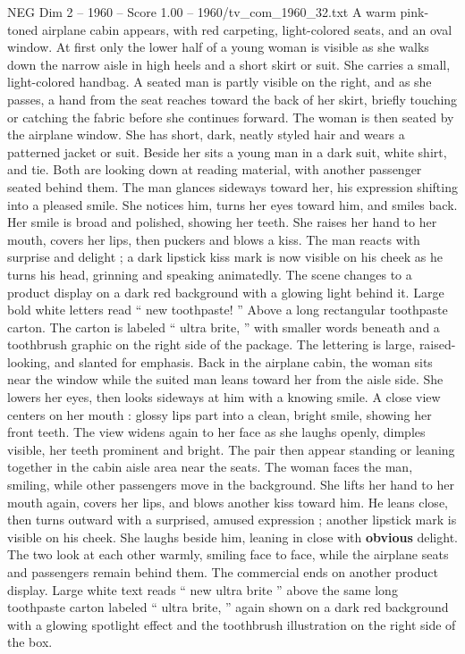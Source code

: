 \begin{textsample}{NEG Dim 2 – 1960 – Score 1.00 – 1960/tv\_com\_1960\_32.txt}  \label{ex:f2_neg_090}
A warm pink-toned airplane cabin appears, with red carpeting, light-colored seats, and an oval window.
At first only the lower half of a young woman is visible as she walks down the narrow aisle in high heels and a short skirt or suit.
She carries a small, light-colored handbag.
A seated man is partly visible on the right, and as she passes, a hand from the seat reaches toward the back of her skirt, briefly touching or catching the fabric before she continues forward.
The woman is then seated by the airplane window.
She has short, dark, neatly styled hair and wears a patterned jacket or suit.
Beside her sits a young man in a dark suit, white shirt, and tie.
Both are looking down at reading material, with another passenger seated behind them.
The man glances sideways toward her, his expression shifting into a pleased smile.
She notices him, turns her eyes toward him, and smiles back.
Her smile is broad and polished, showing her teeth.
She raises her hand to her mouth, covers her lips, then puckers and blows a kiss.
The man reacts with surprise and delight ; a dark lipstick kiss mark is now visible on his cheek as he turns his head, grinning and speaking animatedly.
The scene changes to a product display on a dark red background with a glowing light behind it.
Large bold white letters read “ new toothpaste! ” Above a long rectangular toothpaste carton.
The carton is labeled “ ultra brite, ” with smaller words beneath and a toothbrush graphic on the right side of the package.
The lettering is large, raised-looking, and slanted for emphasis.
Back in the airplane cabin, the woman sits near the window while the suited man leans toward her from the aisle side.
She lowers her eyes, then looks sideways at him with a knowing smile.
A close view centers on her mouth : glossy lips part into a clean, bright smile, showing her front teeth.
The view widens again to her face as she laughs openly, dimples visible, her teeth prominent and bright.
The pair then appear standing or leaning together in the cabin aisle area near the seats.
The woman faces the man, smiling, while other passengers move in the background.
She lifts her hand to her mouth again, covers her lips, and blows another kiss toward him.
He leans close, then turns outward with a surprised, amused expression ; another lipstick mark is visible on his cheek.
She laughs beside him, leaning in close with \textbf{obvious} delight.
The two look at each other warmly, smiling face to face, while the airplane seats and passengers remain behind them.
The commercial ends on another product display.
Large white text reads “ new ultra brite ” above the same long toothpaste carton labeled “ ultra brite, ” again shown on a dark red background with a glowing spotlight effect and the toothbrush illustration on the right side of the box.

\end{textsample}
